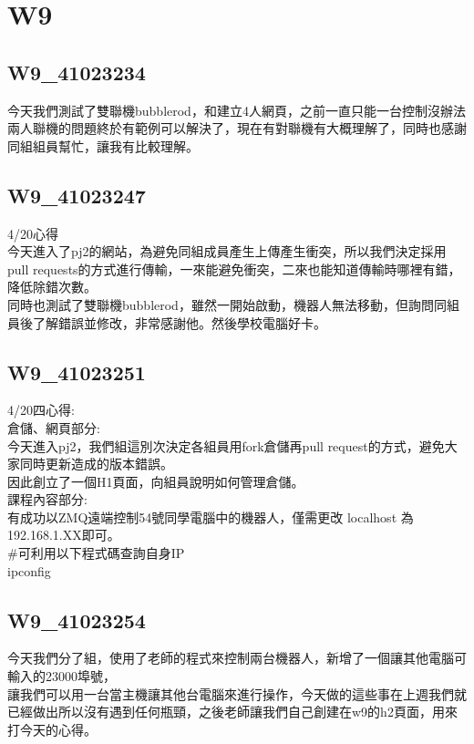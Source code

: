 \chapter{W9}
\section{W9_41023234}
 今天我們測試了雙聯機bubblerod，和建立4人網頁，之前一直只能一台控制沒辦法兩人聯機的問題終於有範例可以解決了，現在有對聯機有大概理解了，同時也感謝同組組員幫忙，讓我有比較理解。\\[6pt]


\section{W9_41023247}
 4/20心得\\

今天進入了pj2的網站，為避免同組成員產生上傳產生衝突，所以我們決定採用pull requests的方式進行傳輸，一來能避免衝突，二來也能知道傳輸時哪裡有錯，降低除錯次數。\\
同時也測試了雙聯機bubblerod，雖然一開始啟動，機器人無法移動，但詢問同組員後了解錯誤並修改，非常感謝他。然後學校電腦好卡。\\

\section{W9_41023251}
 4/20四心得:\\

倉儲、網頁部分:\\

今天進入pj2，我們組這別次決定各組員用fork倉儲再pull request的方式，避免大家同時更新造成的版本錯誤。\\
因此創立了一個H1頁面，向組員說明如何管理倉儲。\\


課程內容部分:\\

有成功以ZMQ遠端控制54號同學電腦中的機器人，僅需更改 localhost 為192.168.1.XX即可。\\
#可利用以下程式碼查詢自身IP\\
	
ipconfig\\

\section{W9_41023254}
今天我們分了組，使用了老師的程式來控制兩台機器人，新增了一個讓其他電腦可輸入的23000埠號，\\
讓我們可以用一台當主機讓其他台電腦來進行操作，今天做的這些事在上週我們就已經做出所以沒有遇到任何瓶頸，之後老師讓我們自己創建在w9的h2頁面，用來打今天的心得。\\

